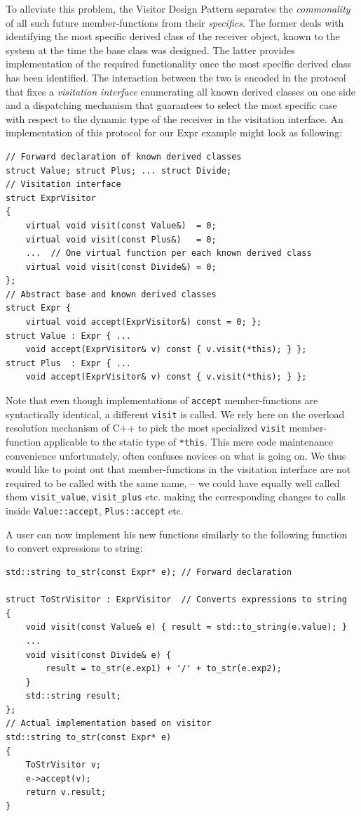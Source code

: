 \documentclass[preprint]{sigplanconf}
\makeatletter
\DeclareRobustCommand{\code}[1]{{\lstinline[breaklines=false,escapechar=@]{#1}}}
\makeatother
\begin{document}
To alleviate this problem, the Visitor Design Pattern separates the 
\emph{commonality} of all such future member-functions from their 
\emph{specifics}. The former deals with identifying the most specific derived 
class of the receiver object, known to the system at the time the base class was 
designed. The latter provides implementation of the required functionality once 
the most specific derived class has been identified. The interaction between the 
two is encoded in the protocol that fixes a \emph{visitation interface} 
enumerating all known derived classes on one side and a dispatching mechanism 
that guarantees to select the most specific case with respect to the dynamic 
type of the receiver in the visitation interface. An implementation of this 
protocol for our Expr example might look as following:

\begin{lstlisting}
// Forward declaration of known derived classes
struct Value; struct Plus; ... struct Divide;
// Visitation interface
struct ExprVisitor
{
    virtual void visit(const Value&)  = 0;
    virtual void visit(const Plus&)   = 0;
    ...  // One virtual function per each known derived class
    virtual void visit(const Divide&) = 0;
};
// Abstract base and known derived classes
struct Expr { 
    virtual void accept(ExprVisitor&) const = 0; };
struct Value : Expr { ...
    void accept(ExprVisitor& v) const { v.visit(*this); } };
struct Plus  : Expr { ...
    void accept(ExprVisitor& v) const { v.visit(*this); } };
\end{lstlisting}

Note that even though implementations of \code{accept} member-functions are 
syntactically identical, a different \code{visit} is called. We rely here on the 
overload resolution mechanism of C++ to pick the most specialized \code{visit} 
member-function applicable to the static type of \code{*this}. This mere code 
maintenance convenience unfortunately, often confuses novices on what 
is going on. We thus would like to point out that member-functions in the 
visitation interface are not required to be called with the same name, -- we 
could have equally well called them \code{visit_value}, \code{visit_plus} etc. 
making the corresponding changes to calls inside \code{Value::accept}, 
\code{Plus::accept} etc.

A user can now implement his new functions similarly to the following function 
to convert expressions to string:

\begin{lstlisting}
std::string to_str(const Expr* e); // Forward declaration

struct ToStrVisitor : ExprVisitor  // Converts expressions to string
{
    void visit(const Value& e) { result = std::to_string(e.value); }
    ...
    void visit(const Divide& e) { 
        result = to_str(e.exp1) + '/' + to_str(e.exp2); 
    }
    std::string result;
};
// Actual implementation based on visitor
std::string to_str(const Expr* e)
{
    ToStrVisitor v;
    e->accept(v);
    return v.result;
}
\end{lstlisting}
\end{document}
